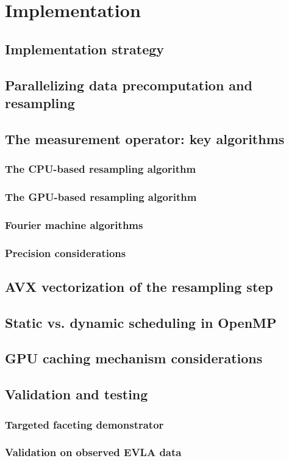 \chapter{Implementation}
\section{Implementation strategy}
\section{Parallelizing data precomputation and resampling}
\section{The measurement operator: key algorithms}
\subsection{The CPU-based resampling algorithm}
\subsection{The GPU-based resampling algorithm}
\subsection{Fourier machine algorithms}
\subsection{Precision considerations}
\section{AVX vectorization of the resampling step}
\section{Static vs. dynamic scheduling in OpenMP}
\section{GPU caching mechanism considerations}
\section{Validation and testing}
\subsection{Targeted faceting demonstrator}
\subsection{Validation on observed EVLA data}